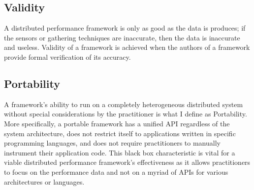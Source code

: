 \subsection{Validity}
A distributed performance framework is only as good as the data is produces; if the sensors or gathering techniques are inaccurate, then the data is inaccurate and useless.
Validity of a framework is achieved when the authors of a framework provide formal verification of its accuracy.

\subsection{Portability}
A framework's ability to run on a completely heterogeneous distributed system without special considerations by the practitioner is what I define as Portability.
More specifically, a portable framework has a unified API regardless of the system architecture, does not restrict itself to applications written in specific programming languages, and does not require practitioners to manually instrument their application code.
This black box characteristic is vital for a viable distributed performance framework's effectiveness as it allows practitioners to focus on the performance data and not on a myriad of APIs for various architectures or languages.

